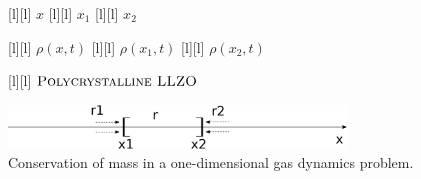 \begin{figure}[ht]
	\centering
	\footnotesize

	[l] {$x$}
	[l] {$x_1$}
	[l] {$x_2$}

	[l] {$\rho(x,t)$}
	[l] {$\rho(x_{1},t)$}
	[l] {$\rho(x_{2},t)$}


	[l] {$\textsc{Polycrystalline LLZO}$}

	\includegraphics[width=0.8\textwidth]{setAinR2.eps}
	\caption{Conservation of mass in a one-dimensional gas dynamics problem.}
	\label{\LABEL}
\end{figure}
